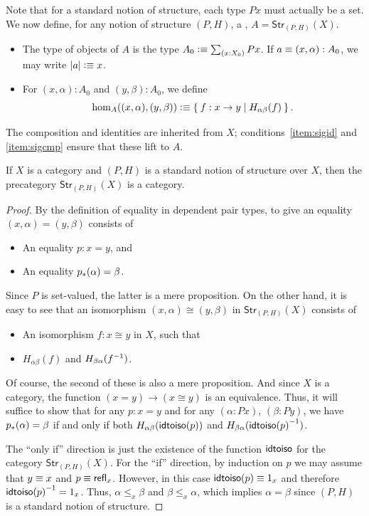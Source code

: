 Note that for a standard notion of structure, each type $Px$ must actually be a set.
We now define, for any notion of structure $(P,H)$, a ,
%
%
$A = \mathsf{Str}_{(P,H)}(X)$.
\begin{itemize}
\item The type of objects of $A$ is the type $A_0 \defeq \sm{x:X_0} Px$.
  If $a\equiv (x,\alpha):A_0$, we may write $|a| \vcentcolon\equiv x$.
\item For $(x,\alpha):A_0$ and $(y,\beta):A_0$, we define
  \[\hom_A((x,\alpha),(y,\beta)) \vcentcolon\equiv \Set{ f:x \to y | H_{\alpha\beta}(f)}.\]
\end{itemize}
The composition and identities are inherited from $X$; conditions~\ref{item:sigid} and \ref{item:sigcmp} ensure that these lift to $A$.

\begin{thm}\label{thm:sip}
  If $X$ is a category and $(P,H)$ is a standard notion of structure over $X$, then the precategory $\mathsf{Str}_{(P,H)}(X)$ is a category.
\end{thm}
\begin{proof}
  By the definition of equality in dependent pair types, to give an equality $(x,\alpha)=(y,\beta)$ consists of
  \begin{itemize}
  \item An equality $p:x=y$, and
  \item An equality ${p}_{*}\mathopen{}\left({\alpha}\right)\mathclose{}=\beta$.
  \end{itemize}
  Since $P$ is set-valued, the latter is a mere proposition.
  On the other hand, it is easy to see that an isomorphism $(x,\alpha)\cong (y,\beta)$ in $\mathsf{Str}_{(P,H)}(X)$ consists of
  \begin{itemize}
  \item An isomorphism $f:x\cong y$ in $X$, such that
  \item $H_{\alpha\beta}(f)$ and $H_{\beta\alpha}({f}^{-1})$.
  \end{itemize}
  Of course, the second of these is also a mere proposition.
  And since $X$ is a category, the function $(x=y) \to (x\cong y)$ is an equivalence.
  Thus, it will suffice to show that for any $p:x=y$ and for any $(\alpha:Px)$, $(\beta:Py)$, we have ${p}_{*}\mathopen{}\left({\alpha}\right)\mathclose{}=\beta$ if and only if both  $H_{\alpha\beta}(\mathsf{idtoiso} (p))$ and $H_{\beta\alpha}({\mathsf{idtoiso}(p)}^{-1})$.

  The ``only if'' direction is just the existence of the function $\mathsf{idtoiso}$ for the category $\mathsf{Str}_{(P,H)}(X)$.
  For the ``if'' direction, by induction on $p$ we may assume that $y\equiv x$ and $p\equiv\mathsf{refl}_{x}$.
  However, in this case $\mathsf{idtoiso} (p)\equiv 1_x$ and therefore ${\mathsf{idtoiso}(p)}^{-1}=1_x$.
  Thus, $\alpha\leq_x \beta$ and $\beta\leq_x \alpha$, which implies $\alpha=\beta$ since $(P,H)$ is a standard notion of structure.
\end{proof}

